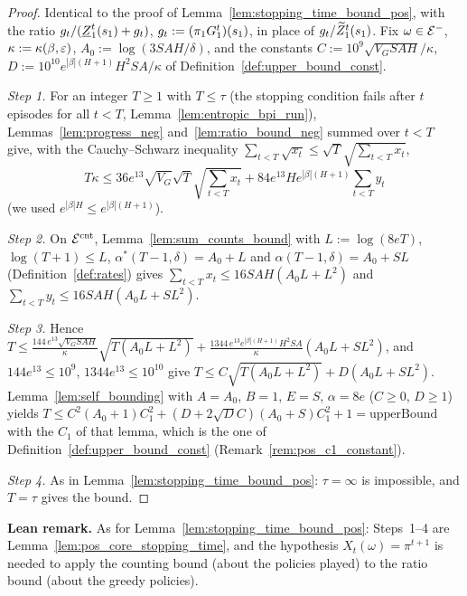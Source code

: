 \begin{proof}
\leanok
Identical to the proof of Lemma~\ref{lem:stopping_time_bound_pos}, with the ratio
$g_t/(\underline{Z}_1^t(s_1) + g_t)$, $g_t := (\pi_1G_1^t)(s_1)$, in place of $g_t/\widetilde{Z}_1^t(s_1)$. Fix
$\omega \in \mathcal{E}^-$, $\kappa := \kappa(\beta,\varepsilon)$, $A_0 := \log(3SAH/\delta)$, and the constants
$C := 10^9\sqrt{V_GSAH}/\kappa$, $D := 10^{10}e^{|\beta|(H+1)}H^2SA/\kappa$ of Definition~\ref{def:upper_bound_const}.

\emph{Step 1.} For an integer $T \ge 1$ with $T \le \tau$ (the stopping condition fails after $t$
episodes for all $t < T$, Lemma~\ref{lem:entropic_bpi_run}), Lemmas~\ref{lem:progress_neg}
and~\ref{lem:ratio_bound_neg} summed over $t < T$ give, with the Cauchy--Schwarz inequality
$\sum_{t<T}\sqrt{x_t} \le \sqrt T\sqrt{\sum_{t<T}x_t}$,
\[
  T\kappa \le 36e^{13}\sqrt{V_G}\sqrt{T}\sqrt{\sum_{t<T}x_t} + 84e^{13}He^{|\beta|(H+1)}\sum_{t<T}y_t
\]
(we used $e^{|\beta|H} \le e^{|\beta|(H+1)}$).

\emph{Step 2.} On $\mathcal{E}^{\mathrm{cnt}}$, Lemma~\ref{lem:sum_counts_bound} with $L := \log(8eT)$, $\log(T+1) \le L$,
$\alpha^*(T-1,\delta) = A_0 + L$ and $\alpha(T-1,\delta) = A_0 + SL$ (Definition~\ref{def:rates}) gives
$\sum_{t<T}x_t \le 16SAH(A_0L + L^2)$ and $\sum_{t<T}y_t \le 16SAH(A_0L + SL^2)$.

\emph{Step 3.} Hence
$T \le \frac{144\,e^{13}\sqrt{V_GSAH}}{\kappa}\sqrt{T(A_0L + L^2)} + \frac{1344\,e^{13}e^{|\beta|(H+1)}H^2SA}{\kappa}(A_0L + SL^2)$,
and $144e^{13} \le 10^9$, $1344e^{13} \le 10^{10}$ give $T \le C\sqrt{T(A_0L + L^2)} + D(A_0L + SL^2)$.
Lemma~\ref{lem:self_bounding} with $A = A_0$, $B = 1$, $E = S$, $\alpha = 8e$ ($C \ge 0$, $D \ge 1$) yields
$T \le C^2(A_0 + 1)C_1^2 + (D + 2\sqrt DC)(A_0 + S)C_1^2 + 1 = \mathrm{upperBound}$ with the $C_1$ of that
lemma, which is the one of Definition~\ref{def:upper_bound_const} (Remark~\ref{rem:pos_c1_constant}).

\emph{Step 4.} As in Lemma~\ref{lem:stopping_time_bound_pos}: $\tau = \infty$ is impossible, and
$T = \tau$ gives the bound.
\end{proof}

\textbf{Lean remark.} As for Lemma~\ref{lem:stopping_time_bound_pos}: Steps~1--4 are
Lemma~\ref{lem:pos_core_stopping_time}, and the hypothesis $X_t(\omega) = \pi^{t+1}$ is needed to apply the
counting bound (about the policies played) to the ratio bound (about the greedy policies).


